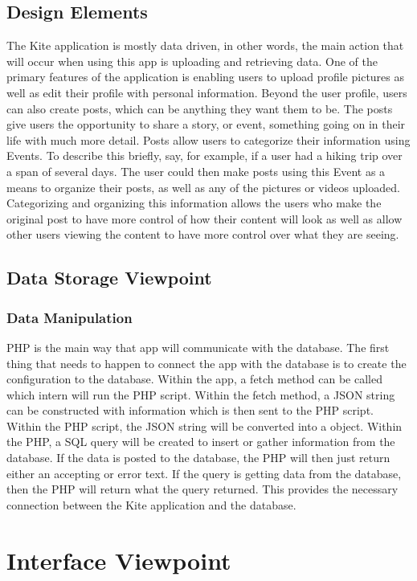 \documentclass[compsoc, 10, draftclsnofoot, onecolumn]{IEEEtran}
\begin{document}
\subsection{Design Elements}
The Kite application is mostly data driven, in other words, the main action that will occur when using this app is uploading and retrieving data. One of the primary features of the application is enabling users to upload profile pictures as well as edit their profile with personal information. Beyond the user profile, users can also create posts, which can be anything they want them to be. The posts give users the opportunity to share a story, or event, something going on in their life with much more detail. Posts allow users to categorize their information using Events. To describe this briefly, say, for example, if a user had a hiking trip over a span of several days. The user could then make posts using this Event as a means to organize their posts, as well as any of the pictures or videos uploaded. Categorizing and organizing this information allows the users who make the original post to have more control of how their content will look as well as allow other users viewing the content to have more control over what they are seeing. 

\subsection{Data Storage Viewpoint}
\subsubsection{Data Manipulation}
PHP is the main way that app will communicate with the database. The first thing that needs to happen to connect the app with the database is to create the configuration to the database. Within the app, a fetch method can be called which intern will run the PHP script. Within the fetch method, a JSON string can be constructed with information which is then sent to the PHP script. Within the PHP script, the JSON string will be converted into a object. Within the PHP, a SQL query will be created to insert or gather information from the database. If the data is posted to the database, the PHP will then just return either an accepting or error text. If the query is getting data from the database, then the PHP will return what the query returned. This provides the necessary connection between the Kite application and the database.

\section{Interface Viewpoint}
\end{document}
